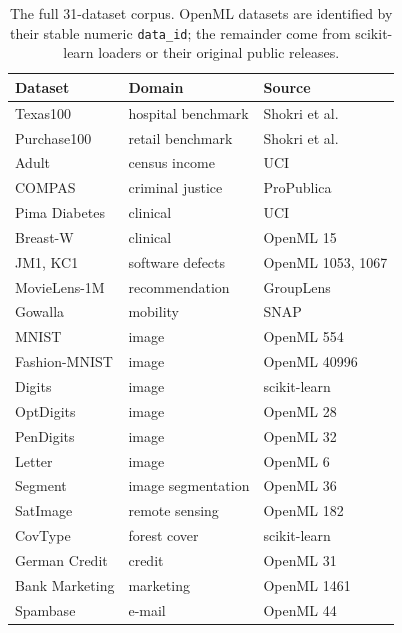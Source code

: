 \begin{table}[t]
\centering
\caption{The full 31-dataset corpus. OpenML datasets are identified by
         their stable numeric \texttt{data\_id}; the remainder come from
         scikit-learn loaders or their original public releases.}
\label{tab:all_datasets}
\small
\setlength{\tabcolsep}{2.2pt}
\begin{tabular}{lll}
\toprule
\textbf{Dataset} & \textbf{Domain} & \textbf{Source} \\
\midrule
Texas100      & hospital benchmark   & Shokri et al.~\cite{shokri2017membership} \\
Purchase100   & retail benchmark     & Shokri et al.~\cite{shokri2017membership} \\
Adult         & census income        & UCI~\cite{adult1996} \\
COMPAS        & criminal justice     & ProPublica~\cite{compas2016} \\
Pima Diabetes & clinical             & UCI~\cite{smith1988pima} \\
Breast-W      & clinical             & OpenML 15 \\
JM1, KC1      & software defects     & OpenML 1053, 1067 \\
MovieLens-1M  & recommendation       & GroupLens~\cite{movielens} \\
Gowalla       & mobility             & SNAP~\cite{cho2011friendship} \\
MNIST         & image                & OpenML 554~\cite{lecun1998gradient} \\
Fashion-MNIST & image                & OpenML 40996 \\
Digits        & image                & scikit-learn \\
OptDigits     & image                & OpenML 28 \\
PenDigits     & image                & OpenML 32 \\
Letter        & image                & OpenML 6 \\
Segment       & image segmentation   & OpenML 36 \\
SatImage      & remote sensing       & OpenML 182 \\
CovType       & forest cover         & scikit-learn~\cite{blackard1999comparative} \\
German Credit & credit               & OpenML 31~\cite{dua2019uci} \\
Bank Marketing& marketing            & OpenML 1461 \\
Spambase      & e-mail               & OpenML 44 \\

\end{tabular}
\end{table}
